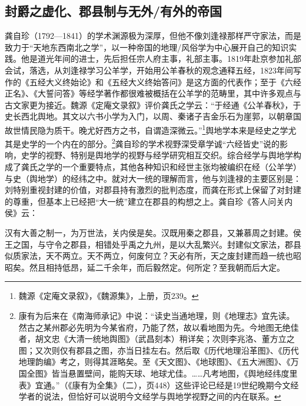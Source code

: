 \documentclass[a4paper, 12pt, openright]{ctexbook}
\renewenvironment{quote}
  {\list{}{\rightmargin2\ccwd \leftmargin2\ccwd \itemindent=2\ccwd \listparindent=2\ccwd}%
   \item\relax\small\kaishu\color{black}}
  {\endlist}
\begin{document}
\subsection{封爵之虚化、郡县制与无外/有外的帝国}

龚自珍（1792—1841）的学术渊源极为深厚，但他不像刘逢禄那样严守家法，而是致力于“天地东西南北之学”，以一种帝国的地理/风俗学为中心展开自己的知识实践。他是道光年间的进士，先后担任宗人府主事，礼部主事。1819年赴京参加礼部会试，落选，从刘逢禄学习公羊学，开始用公羊春秋的观念通释五经，1823年间写作的《五经大义终始论》和《五经大义终始答问》是这方面的代表作；至于《六经正名》、《大誓问答》等经学著作都很难被概括在公羊学的范畴里，其中许多观点与古文家更为接近。魏源《定庵文录叙》评价龚氏之学云：“于经通《公羊春秋》，于史长西北舆地。其文以六书小学为入门，以周、秦诸子吉金乐石为崖郭，以朝章国故世情民隐为质干。晚尤好西方之书，自谓造深微云。”\footnote{魏源《定庵文录叙》，《魏源集》，上册，页239。}舆地学本来是经史之学尤其是史学的一个内在的部分。\footnote{康有为后来在《南海师承记》中说：“读史当通地理，则《地理志》宜先读。然古之某州郡必先明为今某省府，乃能了然，故以看地图为先。今地图无绝佳者，胡文忠《大清一统地舆图》（武昌刻本）稍详矣；次则李兆洛、董方立之图；又次则仅有郡县之图，亦当日挂左右。然后取《历代地理沿革图》、《历代地理韵编》考之，则得其涯略矣。至《天文图》、《地球图》、《五大洲图》、《万国全图》皆当悬置壁间，能购天球、地球尤佳。……凡考地图，《舆地经纬度里表》宜通。”（《康有为全集》（二），页448）这些评论已经是19世纪晚期今文经学者的说法，但恰好可以说明今文经学与舆地学视野之间的内在联系。}龚自珍的学术视野深受章学诚“六经皆史”说的影响，史学的视野、特别是舆地学的视野与经学研究相互交织。综合经学与舆地学构成了龚氏之学的一个重要特点，其他各种知识和经世主张均被编织在经（公羊学）与史（舆地学）的经纬之中。就对大一统的理解而言，他与刘逢禄的主要区别是：刘特别重视封建的价值，对郡县持有激烈的批判态度，而龚在形式上保留了对封建的尊重，但基本上已经把“大一统”建立在郡县的构想之上。龚自珍《答人问关内侯》云：

\begin{quote}
汉有大善之制一，为万世法，关内侯是矣。汉既用秦之郡县，又兼慕周之封建。侯王之国，与守令之郡县，相错处乎禹之九州，是以大乱繁兴。封建似文家法，郡县似质家法，天不两立。天不两立，何废何立？天必有所，天之废封建而趋一统也昭昭矣。然且相持低昂，延二千余年，而后毅然定。何所定？至我朝而后大定。
\end{quote}
\end{document}
